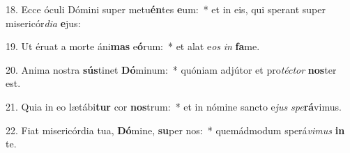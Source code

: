 18. Ecce óculi Dómini super metu\textbf{én}tes \textbf{e}um:~*  et in eis, qui sperant super misericór\textit{di}\textit{a} \textbf{e}jus:\

19. Ut éruat a morte áni\textbf{mas} e\textbf{ó}rum:~*  et alat e\textit{os} \textit{in} \textbf{fa}me.\

20. Anima nostra \textbf{sús}tinet \textbf{Dó}minum:~*  quóniam adjútor et pro\textit{téc}\textit{tor} \textbf{nos}ter est.\

21. Quia in eo lætábi\textbf{tur} cor \textbf{nos}trum:~*  et in nómine sancto e\textit{jus} \textit{spe}\textbf{rá}vimus.\

22. Fiat misericórdia tua, \textbf{Dó}mine, \textbf{su}per nos:~*  quemádmodum sperá\textit{vi}\textit{mus} \textbf{in} te.\


